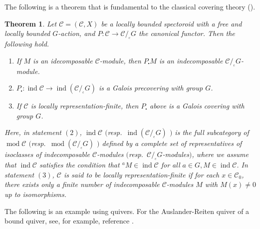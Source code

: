 \documentclass{surv-l}
\numberwithin{equation}{chapter}
\numberwithin{figure}{chapter}
\theoremstyle{plain}
\newtheorem{thm}{Theorem}[section]
\theoremstyle{definition}
\theoremstyle{remark}
\newcommand{\corbit}{/\!_{_{\mathrm{c}}}}
\DeclareMathOperator{\ind}{ind}
\begin{document}
The following is a theorem that is fundamental to the classical covering theory (\cite{Ga}).

\begin{thm}
\label{thm:classic-fund-thm}
Let ${\mathcal{C}} = ({\mathcal{C}} ,X)$ be a locally bounded spectoroid
with a free and locally bounded $G$-action,
and $P\colon {\mathcal{C}} \to {\mathcal{C}}\corbit G$ the canonical functor.
Then the following hold.
\begin{enumerate}
\item If $M$ is an idecomposable $\mathcal{C}$-module, then
$P_{\centerdot} M$ is an indecomposable ${\mathcal{C}}\corbit G$-module.
\item $P_{\centerdot} \colon \ind {\mathcal{C}} \to \ind ({\mathcal{C}}\corbit G)$ is a Galois precovering
with group $G$.
\item If ${\mathcal{C}}$ is \emph{locally representation-finite},
then $P_{\centerdot}$ above is a Galois covering with group $G$.
\end{enumerate}
Here, in statement $(2)$, $\ind {\mathcal{C}}$ $($resp.\ $\ind
({\mathcal{C}}\corbit G)$ $)$ is 
 the full subcategory of $\operatorname{mod} {\mathcal{C}}$ $($resp.\ $\operatorname{mod} ({\mathcal{C}}\corbit G)$ $)$
 defined by a complete set of representatives of isoclasses of indecomposable
${\mathcal{C}}$-modules $($resp.\ ${\mathcal{C}}\corbit G$-modules$)$,
where we assume that $\ind {\mathcal{C}}$ satisfies the condition that
${}^aM \in \ind {\mathcal{C}}$ for all $a \in G, M \in \ind {\mathcal{C}}$.
In statement $(3)$,
${\mathcal{C}}$ is said to be \emph{locally representation-finite}
if for each $x \in {\mathcal{C}}_0$, there exists only a finite number of
indecomposable ${\mathcal{C}}$-modules $M$ with $M(x) \ne 0$
up to isomorphisms.
\end{thm}

The following is an example using quivers.
For the Auslander-Reiten quiver of a bound quiver,
see, for example, reference \cite{ASS}.
\end{document}
